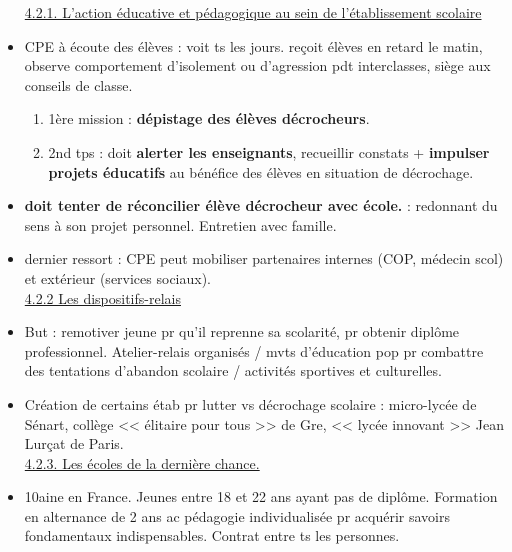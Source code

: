 \documentclass[12pt]{article}
\begin{document}
\begin{itemize}
\underline{4.2.1. L'action éducative et pédagogique au sein de l'établissement scolaire} \\

\item CPE à écoute des élèves : voit ts les jours.  reçoit élèves en retard le matin, observe comportement d'isolement ou d'agression pdt interclasses, siège aux conseils de classe. 
\begin{enumerate}
\item 1ère mission : \textbf{dépistage des élèves décrocheurs}. \\
\item 2nd tps : doit \textbf{alerter les enseignants}, recueillir constats + \textbf{impulser projets éducatifs} au bénéfice des élèves en situation de décrochage. \\
\end{enumerate}

\item \textbf{doit tenter de réconcilier élève décrocheur avec école.} : redonnant du sens à son projet personnel. Entretien avec famille. \\

\item  dernier ressort : CPE peut mobiliser partenaires internes (COP, médecin scol) et extérieur (services sociaux). \\

\underline{4.2.2 Les dispositifs-relais} \\

\item But : remotiver jeune pr qu'il reprenne sa scolarité, pr obtenir diplôme professionnel. Atelier-relais organisés / mvts d'éducation pop pr combattre des tentations d'abandon scolaire / activités sportives et culturelles. \\

\item Création de certains étab pr lutter vs décrochage scolaire : micro-lycée de Sénart, collège << élitaire pour tous >> de Gre, << lycée innovant >> Jean Lurçat de Paris. \\

\underline{4.2.3. Les écoles de la dernière chance.} \\

\item 10aine en France. Jeunes entre 18 et 22 ans ayant pas de diplôme. Formation en alternance de 2 ans ac pédagogie individualisée pr acquérir savoirs fondamentaux indispensables. Contrat entre ts les personnes. \\


\end{itemize}
\end{document}
